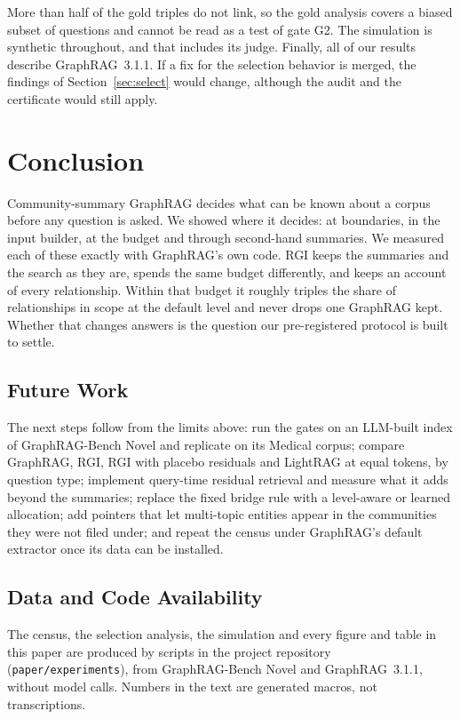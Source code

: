 \documentclass{ieeeaccess}
\theoremstyle{remark}
\begin{document}
More than half of the gold triples do not link, so the gold analysis covers a biased subset of questions and cannot be read as a test of gate G2. The simulation is synthetic throughout, and that includes its judge. Finally, all of our results describe GraphRAG~3.1.1. If a fix for the selection behavior is merged, the findings of Section~\ref{sec:select} would change, although the audit and the certificate would still apply.

\section{Conclusion}\label{sec:conclusion}
Community-summary GraphRAG decides what can be known about a corpus before any question is asked. We showed where it decides: at boundaries, in the input builder, at the budget and through second-hand summaries. We measured each of these exactly with GraphRAG's own code. RGI keeps the summaries and the search as they are, spends the same budget differently, and keeps an account of every relationship. Within that budget it roughly triples the share of relationships in scope at the default level and never drops one GraphRAG kept. Whether that changes answers is the question our pre-registered protocol is built to settle.

\subsection{Future Work}\label{sec:future}
The next steps follow from the limits above: run the gates on an LLM-built index of GraphRAG-Bench Novel and replicate on its Medical corpus; compare GraphRAG, RGI, RGI with placebo residuals and LightRAG at equal tokens, by question type; implement query-time residual retrieval and measure what it adds beyond the summaries; replace the fixed bridge rule with a level-aware or learned allocation; add pointers that let multi-topic entities appear in the communities they were not filed under; and repeat the census under GraphRAG's default extractor once its data can be installed.

\subsection{Data and Code Availability}\label{sec:data}
The census, the selection analysis, the simulation and every figure and table in this paper are produced by scripts in the project repository (\texttt{paper/experiments}), from GraphRAG-Bench Novel and GraphRAG~3.1.1, without model calls. Numbers in the text are generated macros, not transcriptions.
\end{document}
